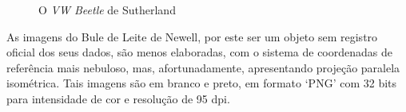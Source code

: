 \begin{figure}[!htb]
	\centering
	\quad
	\quad
	\caption{O \textit{VW Beetle} de Sutherland}
	\label{sutherlandVWDuplo}
\end{figure}
	
	As imagens do Bule de Leite de Newell, por este ser um objeto sem registro oficial dos seus dados, são menos elaboradas, com o sistema de coordenadas de referência mais nebuloso, mas, afortunadamente, apresentando projeção paralela isométrica. Tais imagens são em branco e preto, em formato `PNG' com 32 bits para intensidade de cor e resolução de 95 dpi.

